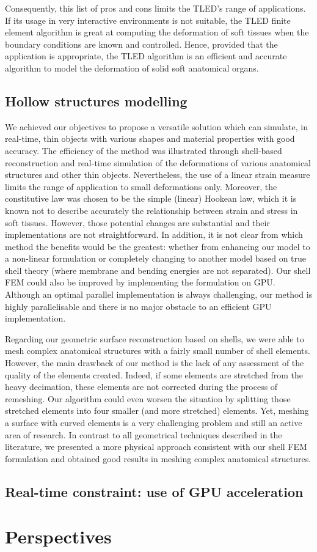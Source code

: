 Consequently, this list of pros and cons limits the TLED's range of applications. If its usage in very interactive environments is not suitable, the TLED finite element algorithm is great at computing the deformation of soft tissues when the boundary conditions are known and controlled. Hence, provided that the application is appropriate, the TLED algorithm is an efficient and accurate algorithm to model the deformation of solid soft anatomical organs. 

	\subsection{Hollow structures modelling}
	
We achieved our objectives to propose a versatile solution which can simulate, in real-time, thin objects with various shapes and material properties with good accuracy. The efficiency of the method was illustrated through shell-based reconstruction and real-time simulation of the deformations of various anatomical structures and other thin objects. Nevertheless, the use of a linear strain measure limits the range of application to small deformations only. Moreover, the constitutive law was chosen to be the simple (linear) Hookean law, which it is known not to describe accurately the relationship between strain and stress in soft tissues. However, those potential changes are substantial and their implementations are not straightforward. In addition, it is not clear from which method the benefits would be the greatest: whether from enhancing our model to a non-linear formulation or completely changing to another model based on true shell theory (where membrane and bending energies are not separated). Our shell FEM could also be improved by implementing the formulation on GPU. Although an optimal parallel implementation is always challenging, our method is highly parallelisable and there is no major obstacle to an efficient GPU implementation.

Regarding our geometric surface reconstruction based on shells, we were able to mesh complex anatomical structures with a fairly small number of shell elements. However, the main drawback of our method is the lack of any assessment of the quality of the elements created. Indeed, if some elements are stretched from the heavy decimation, these elements are not corrected during the process of remeshing. Our algorithm could even worsen the situation by splitting those stretched elements into four smaller (and more stretched) elements. Yet, meshing a surface with curved elements is a very challenging problem and still an active area of research. In contrast to all geometrical techniques described in the literature, we presented a more physical approach consistent with our shell FEM formulation and obtained good results in meshing complex anatomical structures. 

	
	\subsection{Real-time constraint: use of GPU acceleration}	
	

\section{Perspectives}


